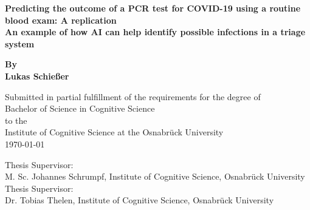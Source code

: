 \begin{titlepage}
	\begin{center}
		\vspace*{1cm}
		\Huge
		\textbf{Predicting the outcome of a PCR test for COVID-19 using a 
routine blood exam: A replication \\} 
		\vspace{0.5cm}
		\Large
		\textbf{An example of how AI can help identify possible infections in 
a triage system}
		
		\vspace{1cm}
		
		\textbf{By \\ Lukas Schießer}
		
		\vspace{1cm}
		\small
		Submitted in partial fulfillment of the requirements for the degree of \\
		Bachelor of Science in Cognitive Science \\ to the \\
		Institute of Cognitive Science at the Osnabrück University\\
		\today
		
		\vfill
		\vspace{1cm}
		Thesis Supervisor:\\ M. Sc. Johannes Schrumpf, Institute of Cognitive 
Science, Osnabrück University \\
		Thesis Supervisor:\\   Dr. Tobias Thelen, Institute of Cognitive 
Science, Osnabrück University
		
		
		
	\end{center}
\end{titlepage}
